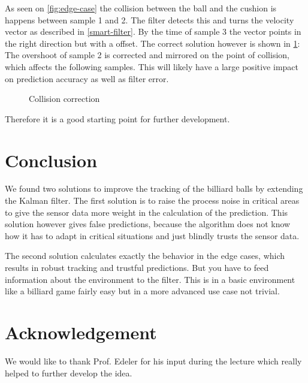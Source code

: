 \documentclass[titlepage, a4paper, 11pt]{scrartcl}
\begin{document}
As seen on \cref{fig:edge-case} the collision between the ball and the cushion is happens between sample 1 and 2. 
The filter detects this and turns the velocity vector as described in \cref{smart-filter}.
By the time of sample 3 the vector points in the right direction but with a offset. The correct solution however is shown in \cref{fig:edge-case-sol}:
The overshoot of sample 2 is corrected and mirrored on the point of collision, which affects the following samples. 
This will likely have a large positive impact on prediction accuracy as well as filter error.

\begin{figure}[H]
    \centering
    \caption{Collision correction}
    \label{fig:edge-case-sol}
\end{figure}

Therefore it is a good starting point for further development.

\section{Conclusion} 

We found two solutions to improve the tracking of the billiard balls by extending the Kalman filter.
The first solution is to raise the process noise in critical areas to give the sensor data more weight in the calculation of the prediction.
This solution however gives false predictions, because the algorithm does not know how it has to adapt in critical situations and just blindly trusts the sensor data.

The second solution calculates exactly the behavior in the edge cases, which results in robust tracking and trustful predictions. But you have to feed information about the environment to the filter.
This is in a basic environment like a billiard game fairly easy but in a more advanced use case not trivial.


\section{Acknowledgement}

We would like to thank Prof. Edeler for his input during the lecture which really helped to further develop the idea.

\clearpage

 

\end{document}
